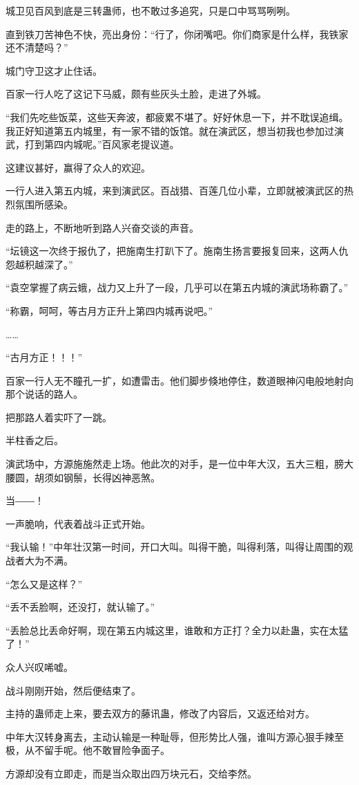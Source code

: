 \begin{this_body}
城卫见百风到底是三转蛊师，也不敢过多追究，只是口中骂骂咧咧。

直到铁刀苦神色不快，亮出身份：“行了，你闭嘴吧。你们商家是什么样，我铁家还不清楚吗？”

城门守卫这才止住话。

百家一行人吃了这记下马威，颇有些灰头土脸，走进了外城。

“我们先吃些饭菜，这些天奔波，都疲累不堪了。好好休息一下，并不耽误追缉。我正好知道第五内城里，有一家不错的饭馆。就在演武区，想当初我也参加过演武，打到第四内城呢。”百风家老提议道。

这建议甚好，赢得了众人的欢迎。

一行人进入第五内城，来到演武区。百战猎、百莲几位小辈，立即就被演武区的热烈氛围所感染。

走的路上，不断地听到路人兴奋交谈的声音。

“坛镜这一次终于报仇了，把施南生打趴下了。施南生扬言要报复回来，这两人仇怨越积越深了。”

“袁空掌握了病云蛾，战力又上升了一段，几乎可以在第五内城的演武场称霸了。”

“称霸，呵呵，等古月方正升上第四内城再说吧。”

……

“古月方正！！！”

百家一行人无不瞳孔一扩，如遭雷击。他们脚步倏地停住，数道眼神闪电般地射向那个说话的路人。

把那路人着实吓了一跳。

半柱香之后。

演武场中，方源施施然走上场。他此次的对手，是一位中年大汉，五大三粗，膀大腰圆，胡须如钢鬃，长得凶神恶煞。

当――！

一声脆响，代表着战斗正式开始。

“我认输！”中年壮汉第一时间，开口大叫。叫得干脆，叫得利落，叫得让周围的观战者大为不满。

“怎么又是这样？”

“丢不丢脸啊，还没打，就认输了。”

“丢脸总比丢命好啊，现在第五内城这里，谁敢和方正打？全力以赴蛊，实在太猛了！”

众人兴叹唏嘘。

战斗刚刚开始，然后便结束了。

主持的蛊师走上来，要去双方的藤讯蛊，修改了内容后，又返还给对方。

中年大汉转身离去，主动认输是一种耻辱，但形势比人强，谁叫方源心狠手辣至极，从不留手呢。他不敢冒险争面子。

方源却没有立即走，而是当众取出四万块元石，交给李然。


\end{this_body}
